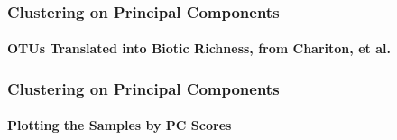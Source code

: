 \documentclass[10pt]{beamer}
\newcommand{\iwsframe}[2]{
\begin{frame}[fragile]
\frametitle{#1}
\framesubtitle{#2}
}
\begin{document}
\iwsframe{Clustering on Principal Components}{OTUs Translated into Biotic Richness, from Chariton, et al.}
\begin{center}
\end{center}
\end{frame}


\iwsframe{Clustering on Principal Components}{Plotting the Samples by PC Scores}

\hspace*{-0.5in}

\end{frame}
\end{document}
